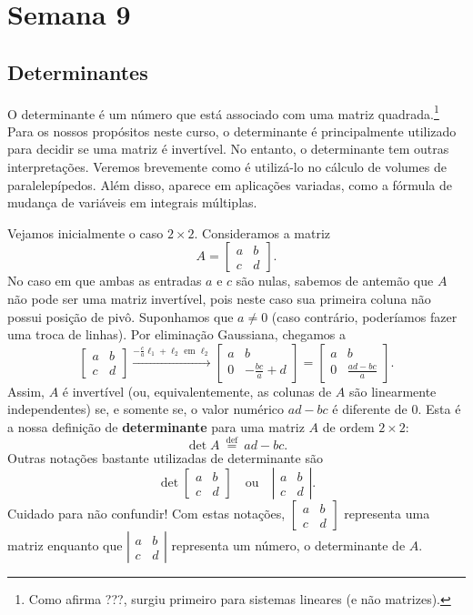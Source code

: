 \documentclass[../livro.tex]{subfiles}  %
\begin{document}
\chapter{Semana 9}

\section{Determinantes}

O determinante é um número que está associado com uma matriz quadrada.\footnote{Como afirma ???, surgiu primeiro para sistemas lineares (e não matrizes).} Para os nossos propósitos neste curso, o determinante é principalmente utilizado para decidir se uma matriz é invertível. No entanto, o determinante tem outras interpretações. Veremos brevemente como é utilizá-lo no cálculo de volumes de paralelepípedos. Além disso, aparece em aplicações variadas, como a fórmula de mudança de variáveis em integrais múltiplas.

Vejamos inicialmente o caso $2 \times 2$. Consideramos a matriz
\[
A = \begin{bmatrix}
a & b \\
c & d
\end{bmatrix}.
\] No caso em que ambas as entradas $a$ e $c$ são nulas, sabemos de antemão que $A$ não pode ser uma matriz invertível, pois neste caso sua primeira coluna não possui posição de pivô. Suponhamos que $a \neq 0$ (caso contrário, poderíamos fazer uma troca de linhas). Por eliminação Gaussiana, chegamos a
\[
\begin{bmatrix}
a & b \\
c & d
\end{bmatrix} \xrightarrow{- \frac{c}{a} \ell_1 + \ell_2 \text{ em } \ell_2}
\begin{bmatrix}
a & b \\
0 & - \frac{bc}{a} + d
\end{bmatrix} = 
\begin{bmatrix}
a & b \\
0 & \frac{ad - bc}{a}
\end{bmatrix}.
\] Assim, $A$ é invertível (ou, equivalentemente, as colunas de $A$ são linearmente independentes) se, e somente se, o valor numérico $ad - bc$ é diferente de $0$. Esta é a nossa definição de \textbf{determinante} para uma matriz $A$ de ordem $2 \times 2$:
\[
\det A \ \stackrel{\text{def}}{=} \ ad - bc.
\] Outras notações bastante utilizadas de determinante são
\[
\det \begin{bmatrix}
a & b \\
c & d
\end{bmatrix} \quad \text{ou} \quad
\left| \begin{matrix}
a & b \\
c & d
\end{matrix} \right|.
\] Cuidado para não confundir! Com estas notações, $\begin{bmatrix}
a & b \\
c & d
\end{bmatrix}$ representa uma matriz enquanto que $\left| \begin{matrix}
a & b \\
c & d
\end{matrix} \right|$ representa um número, o determinante de $A$. 
\end{document}
